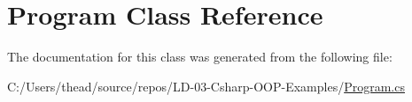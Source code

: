 \hypertarget{class_program}{}\section{Program Class Reference}
\label{class_program}


The documentation for this class was generated from the following file\+:\begin{DoxyCompactItemize}
\item 
C\+:/\+Users/thead/source/repos/\+L\+D-\/03-\/\+Csharp-\/\+O\+O\+P-\/\+Examples/\mbox{\hyperlink{_program_8cs}{Program.\+cs}}\end{DoxyCompactItemize}
